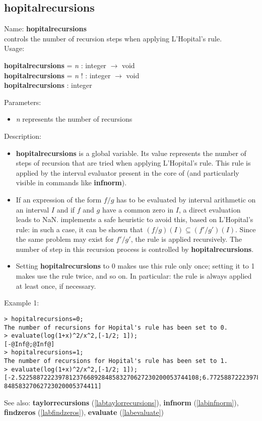 \subsection{hopitalrecursions}
\label{labhopitalrecursions}
\noindent Name: \textbf{hopitalrecursions}\\
controls the number of recursion steps when applying L'Hopital's rule.\\
\noindent Usage: 
\begin{center}
\textbf{hopitalrecursions} = \emph{n} : \textsf{integer} $\rightarrow$ \textsf{void}\\
\textbf{hopitalrecursions} = \emph{n} ! : \textsf{integer} $\rightarrow$ \textsf{void}\\
\textbf{hopitalrecursions} : \textsf{integer}\\
\end{center}
Parameters: 
\begin{itemize}
\item \emph{n} represents the number of recursions
\end{itemize}
\noindent Description: \begin{itemize}

\item \textbf{hopitalrecursions} is a global variable. Its value represents the number of steps of
   recursion that are tried when applying L'Hopital's rule. This rule is applied
   by the interval evaluator present in the core of \sollya (and particularly
   visible in commands like \textbf{infnorm}).

\item If an expression of the form $f/g$ has to be evaluated by interval 
   arithmetic on an interval $I$ and if $f$ and $g$ have a common zero
   in $I$, a direct evaluation leads to NaN.
   \sollya implements a safe heuristic to avoid this, based on L'Hopital's rule: in 
   such a case, it can be shown that $(f/g)(I) \subseteq (f'/g')(I)$. Since
   the same problem may exist for $f'/g'$, the rule is applied recursively.
   The number of step in this recursion process is controlled by \textbf{hopitalrecursions}.

\item Setting \textbf{hopitalrecursions} to 0 makes \sollya use this rule only once;
   setting it to 1 makes \sollya use the rule twice, and so on.
   In particular: the rule is always applied at least once, if necessary.
\end{itemize}
\noindent Example 1: 
\begin{center}\begin{minipage}{15cm}\begin{Verbatim}[frame=single]
> hopitalrecursions=0;
The number of recursions for Hopital's rule has been set to 0.
> evaluate(log(1+x)^2/x^2,[-1/2; 1]);
[-@Inf@;@Inf@]
> hopitalrecursions=1;
The number of recursions for Hopital's rule has been set to 1.
> evaluate(log(1+x)^2/x^2,[-1/2; 1]);
[-2.52258872223978123766892848583270627230200053744108;6.77258872223978123766892
84858327062723020005374411]
\end{Verbatim}
\end{minipage}\end{center}
See also: \textbf{taylorrecursions} (\ref{labtaylorrecursions}), \textbf{infnorm} (\ref{labinfnorm}), \textbf{findzeros} (\ref{labfindzeros}), \textbf{evaluate} (\ref{labevaluate})
